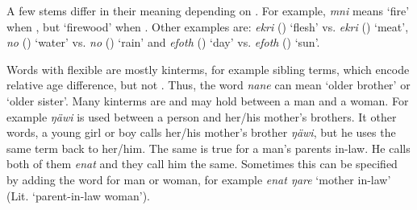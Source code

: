 A few stems differ in their meaning depending on . For example, \emph{mni} means `fire' when , but `firewood' when . Other examples are: \emph{ekri} (\F) `flesh' vs. \emph{ekri} (\Masc) `meat', \emph{no} (\F) `water' vs. \emph{no}  (\Masc) `rain' and \emph{efoth} (\F) `day' vs. \emph{efoth} (\Masc) `sun'.%

Words with flexible  are mostly kinterms, for example sibling terms, which encode relative age difference, but not . Thus, the word \emph{nane} can mean `older brother' or `older sister'. Many kinterms are  and may hold between a man and a woman. For example \emph{ŋäwi} is used between a person and her/his mother's brothers. It other words, a young girl or boy calls her/his mother's brother \emph{ŋäwi}, but he uses the same term back to her/him. The same is true for a man's parents in-law. He calls both of them \emph{enat} and they call him the same. Sometimes this can be specified by adding the word for man or woman, for example \emph{enat ŋare} `mother in-law' (Lit. `parent-in-law woman').

